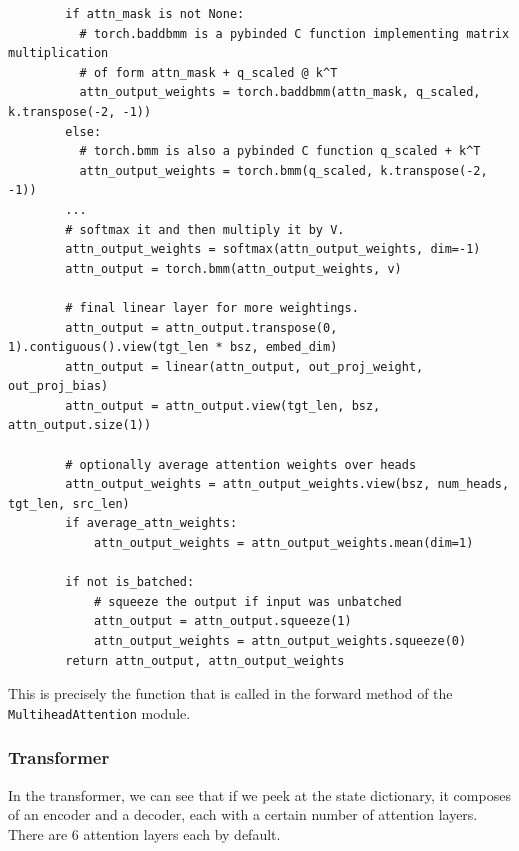 \begin{lstlisting}
        if attn_mask is not None:
          # torch.baddbmm is a pybinded C function implementing matrix multiplication 
          # of form attn_mask + q_scaled @ k^T
          attn_output_weights = torch.baddbmm(attn_mask, q_scaled, k.transpose(-2, -1))
        else:
          # torch.bmm is also a pybinded C function q_scaled + k^T
          attn_output_weights = torch.bmm(q_scaled, k.transpose(-2, -1))
        ...
        # softmax it and then multiply it by V. 
        attn_output_weights = softmax(attn_output_weights, dim=-1)
        attn_output = torch.bmm(attn_output_weights, v)

        # final linear layer for more weightings. 
        attn_output = attn_output.transpose(0, 1).contiguous().view(tgt_len * bsz, embed_dim)
        attn_output = linear(attn_output, out_proj_weight, out_proj_bias)
        attn_output = attn_output.view(tgt_len, bsz, attn_output.size(1))

        # optionally average attention weights over heads
        attn_output_weights = attn_output_weights.view(bsz, num_heads, tgt_len, src_len)
        if average_attn_weights:
            attn_output_weights = attn_output_weights.mean(dim=1)

        if not is_batched:
            # squeeze the output if input was unbatched
            attn_output = attn_output.squeeze(1)
            attn_output_weights = attn_output_weights.squeeze(0)
        return attn_output, attn_output_weights
      \end{lstlisting}

      This is precisely the function that is called in the forward method of the \texttt{MultiheadAttention} module. 
  
    \subsubsection{Transformer}

      In the transformer, we can see that if we peek at the state dictionary, it composes of an encoder and a decoder, each with a certain number of attention layers. There are 6 attention layers each by default. 

